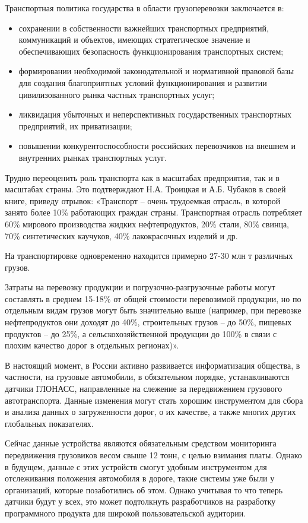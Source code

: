 \documentclass{lstu-diploma}
\begin{document}
Транспортная политика государства в области грузоперевозки заключается в:
\begin{itemize}
    \item сохранении в собственности важнейших транспортных предприятий,
		коммуникаций и объектов, имеющих стратегическое значение и
		обеспечивающих безопасность функционирования транспортных систем;
	\item формировании необходимой законодательной и нормативной правовой базы
		для создания благоприятных условий функционирования и развитии
		цивилизованного рынка частных транспортных услуг;
	\item ликвидация убыточных и неперспективных государственных транспортных
		предприятий, их приватизации;
	\item повышении конкурентоспособности российских перевозчиков на внешнем и
		внутренних рынках транспортных услуг.
\end{itemize}

Трудно переоценить роль транспорта как в масштабах предприятия, так и в
масштабах страны. Это подтверждают Н.А. Троицкая и А.Б. Чубаков в своей книге,
приведу отрывок: «Транспорт – очень трудоемкая отрасль, в которой занято более
10\% работающих граждан страны. Транспортная отрасль потребляет 60\% мирового
производства жидких нефтепродуктов, 20\% стали, 80\% свинца, 70\% синтетических
каучуков, 40\% лакокрасочных изделий и др.

На транспортировке одновременно находится примерно 27-30 млн т различных грузов.

Затраты на перевозку продукции и погрузочно-разгрузочные работы могут составлять
в среднем 15-18\% от общей стоимости перевозимой продукции, но по отдельным видам
грузов могут быть значительно выше (например, при перевозке нефтепродуктов они
доходят до 40\%, строительных грузов – до 50\%, пищевых продуктов – до 25\%, а
сельскохозяйственной продукции до 100\% в связи с плохим качество дорог в
отдельных регионах)».

В настоящий момент, в России активно развивается информатизация общества, в
частности, на грузовые автомобили, в обязательном порядке, устанавливаются
датчики ГЛОНАСС, направленные на слежение за передвижением грузового
автотранспорта. Данные изменения могут стать хорошим инструментом для сбора и
анализа данных о загруженности дорог, о их качестве, а также многих других
глобальных показателях.

Сейчас данные устройства являются обязательным средством мониторинга
передвижения грузовиков весом свыше 12 тонн, с целью взимания платы. Однако в
будущем, данные с этих устройств смогут удобным инструментом для отслеживания
положения автомобиля в дороге, такие  системы уже были у организаций, которые
позаботились об этом. Однако учитывая то что теперь датчики будут у всех, это
может подтолкнуть разработчиков на разработку программного продукта для широкой
пользовательской аудитории.
\end{document}
